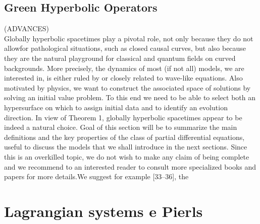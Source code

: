 \documentclass[Main]{subfiles}
\begin{document}
	\section{Green Hyperbolic Operators}
		\begin{Warning}
		(ADVANCES)\\
		Globally hyperbolic spacetimes play a pivotal role, not only because they do not allowfor pathological situations, such as closed causal curves, but also because they are the natural playground for classical and quantum fields on curved backgrounds. More precisely, the dynamics of most (if not all) models, we are interested in, is either ruled by or closely related to wave-like equations. Also motivated by physics, we want to construct the associated space of solutions by solving an initial value problem. To this end we need to be able to select both an hypersurface on which to assign initial data and to identify an evolution direction. In view of Theorem 1, globally hyperbolic spacetimes appear to be indeed a natural choice. Goal of this section will be to summarize the main definitions and the key properties of the class of partial differential equations, useful to discuss the models that we shall introduce in the next sections. Since this is an overkilled topic, we do not wish to make any claim of being complete and we recommend to an interested reader to consult more specialized books and papers for more details.We suggest for example [33–36], the
		\end{Warning}



\chapter{Lagrangian systems e Pierls}
\end{document}
